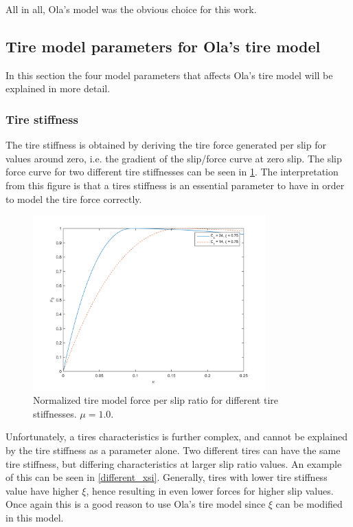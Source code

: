 All in all, Ola's model was the obvious choice for this work.

\subsection{Tire model parameters for Ola's tire model}
In this section the four model parameters that affects Ola's tire model will be explained in more detail.

\subsubsection{Tire stiffness}
The tire stiffness is obtained by deriving the tire force generated per slip for values around zero, i.e. the gradient of the slip/force curve at zero slip. The slip force curve for two different tire stiffnesses can be seen in \ref{different_cx}. The interpretation from this figure is that a tires stiffness is an essential parameter to have in order to model the tire force correctly. 

\begin{figure}[h]
	\centering
	\includegraphics[width=0.8\textwidth]{Pictures/slipkraft_olika_cx}
	\caption {Normalized tire model force per slip ratio for different tire stiffnesses. $ \mu = 1.0 $.}
	\label{different_cx}
\end{figure}

Unfortunately, a tires characteristics is further complex, and cannot be explained by the tire stiffness as a parameter alone. Two different tires can have the same tire stiffness, but differing characteristics at larger slip ratio values. An example of this can be seen in \ref{different_xsi}. Generally, tires with lower tire stiffness value have higher $ \xi $, hence resulting in even lower forces for higher slip values. Once again this is a good reason to use Ola's tire model since $ \xi $ can be modified in this model.

